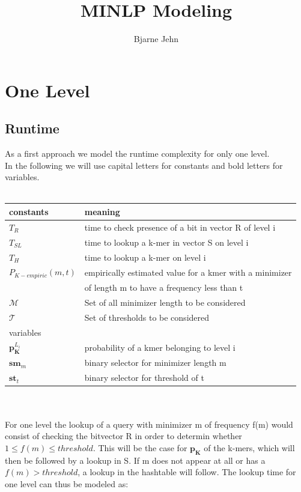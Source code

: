 \documentclass{article}
\title{MINLP Modeling}
\author{Bjarne Jehn}
\newcommand{\timeForCheckInR}{{T_R}}
\newcommand{\timeForLookupInS}{{T_{SL}}}
\newcommand{\timeForHashtable}{{T_H}}
\newcommand{\percKmers}{\textbf{p}_\textbf{K}}
\newcommand{\percKmersEmpiric}{P_{K-empiric}}
\newcommand{\possibleMinimizerLength}{\mathcal{M}}
\newcommand{\possibleThresholds}{\mathcal{T}}
\newcommand{\selectorm}{\textbf{sm}}
\newcommand{\selectort}{\textbf{st}}
\newcommand{\levelI}{{L_i}}
\begin{document}
	
\maketitle
\newpage



\section*{One Level}
\subsection*{Runtime}
As a first approach we model the runtime complexity for only one level.\\
In the following we will use capital letters for constants and bold letters for variables.\\
\\
\begin{tabular}{ l | l }
	constants	& meaning \\
	\hline
	$\timeForCheckInR$		& time to check presence of a bit in vector R of level i \\
	$\timeForLookupInS$		& time to lookup a k-mer in vector S on level i \\
	$\timeForHashtable$		& time to lookup a k-mer on level i \\
	$\percKmersEmpiric(m, t)$ &empirically estimated value for a kmer with a minimizer \\
	& of length m to have a frequency less than t \\
	$\possibleMinimizerLength$			& Set of all minimizer length to be considered \\
	$\possibleThresholds$			& Set of thresholds to be considered \\
	\hline
	\hline
	variables	&  \\
	\hline
	$\percKmers^\levelI$		& probability of a kmer belonging to level i \\
	$\selectorm_m$	& binary selector for minimizer length m\\
	$\selectort_t$	& binary selector for threshold of t\\
\end{tabular}\\
\\
For one level the lookup of a query with minimizer m of frequency f(m) would consist of checking the bitvector R in order to determin whether $1 \leq f(m) \leq threshold$. This will be the case for $\percKmers$ of the k-mers, which will then be followed by a lookup in S. If m does not appear at all or has a $f(m) > threshold$, a lookup in the hashtable will follow. The lookup time for one level can thus be modeled as:
\end{document}
